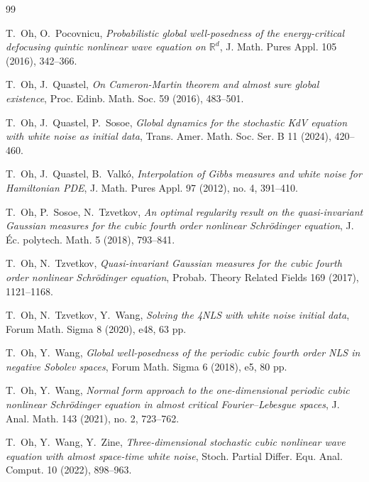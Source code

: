 \documentclass[letterpaper, 11pt,  reqno]{amsart}
\newcommand{\1}{\hspace{0.5mm}\text{I}\hspace{0.5mm}}
\newcommand{\R}{\mathbb{R}}
\numberwithin{equation}{section}
\numberwithin{theorem}{section}
\begin{document}
\begin{thebibliography}{99}
%
%
%


T.~Oh, O.~Pocovnicu,
{\it  Probabilistic global well-posedness of the energy-critical defocusing quintic nonlinear wave equation on $\R^d$}, J. Math. Pures Appl. 105 (2016), 342--366. 



T.~Oh, J.~Quastel,
{\it  On Cameron-Martin theorem and almost sure global existence}, 
Proc. Edinb. Math. Soc. 59 (2016), 483--501. 


T.~Oh, J.~Quastel, P.~Sosoe,
{\it Global dynamics for the stochastic KdV equation with white noise as initial data},
Trans. Amer. Math. Soc. Ser. B 11 (2024), 420--460.



T.~Oh, J.~Quastel, B.~Valk\'o,
{\it  Interpolation of Gibbs measures and white noise for Hamiltonian PDE},
J. Math. Pures Appl. 97 (2012), no. 4, 391--410. 


T.~Oh, P.~Sosoe, N.~Tzvetkov,
{\it  An optimal regularity result on the quasi-invariant Gaussian measures for the cubic fourth order nonlinear Schr\"odinger equation},  
J. \'Ec. polytech. Math. 5 (2018), 793--841. 




T.~Oh,  N.~Tzvetkov,
{\it  Quasi-invariant Gaussian measures for the cubic fourth order nonlinear Schr\"odinger equation}, 
 Probab. Theory Related Fields 169 (2017), 1121--1168. 


T.~Oh, N.~Tzvetkov, Y.~Wang,
{\it  Solving the 4NLS with white noise initial data}, Forum Math. Sigma 8 (2020), e48, 63 pp. 


T.~Oh, Y.~Wang,
{\it Global well-posedness of the periodic cubic fourth order NLS in negative Sobolev spaces},
 Forum Math. Sigma 6 (2018), e5, 80 pp. 

T.~Oh, Y.~Wang,
{\it  Normal form approach to the one-dimensional periodic cubic nonlinear Schr\"odinger equation in almost critical Fourier--Lebesgue spaces}, 
J. Anal. Math. 143 (2021), no. 2, 723--762. 



T.~Oh, Y.~Wang, Y.~Zine,
{\it  Three-dimensional stochastic cubic nonlinear wave equation with almost space-time white noise},  Stoch. Partial Differ. Equ. Anal. Comput. 10 (2022), 898--963.



\end{thebibliography}
\end{document}
